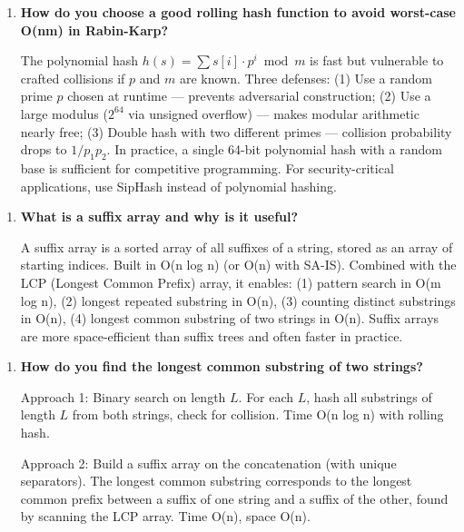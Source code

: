 \begin{enumerate}
\item \textbf{How do you choose a good rolling hash function to avoid worst-case O(nm) in Rabin-Karp?}

The polynomial hash $h(s) = \sum s[i] \cdot p^{i} \bmod m$ is fast but vulnerable to crafted collisions if $p$ and $m$ are known. Three defenses: (1) Use a random prime $p$ chosen at runtime --- prevents adversarial construction; (2) Use a large modulus ($2^{64}$ via unsigned overflow) --- makes modular arithmetic nearly free; (3) Double hash with two different primes --- collision probability drops to $1/p_1 p_2$. In practice, a single 64-bit polynomial hash with a random base is sufficient for competitive programming. For security-critical applications, use SipHash instead of polynomial hashing.
\end{enumerate}

\begin{enumerate}
\item \textbf{What is a suffix array and why is it useful?}

A suffix array is a sorted array of all suffixes of a string, stored as an array of starting indices. Built in O(n log n) (or O(n) with SA-IS). Combined with the LCP (Longest Common Prefix) array, it enables: (1) pattern search in O(m log n), (2) longest repeated substring in O(n), (3) counting distinct substrings in O(n), (4) longest common substring of two strings in O(n). Suffix arrays are more space-efficient than suffix trees and often faster in practice.
\end{enumerate}

\begin{enumerate}
\item \textbf{How do you find the longest common substring of two strings?}

Approach 1: Binary search on length $L$. For each $L$, hash all substrings of length $L$ from both strings, check for collision. Time O(n log n) with rolling hash.

Approach 2: Build a suffix array on the concatenation (with unique separators). The longest common substring corresponds to the longest common prefix between a suffix of one string and a suffix of the other, found by scanning the LCP array. Time O(n), space O(n).
\end{enumerate}

